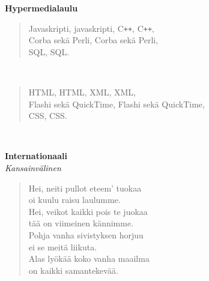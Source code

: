 %
%
\noindent\begin{minipage}{\linewidth}
\vspace{5pt}
\parbox[t]{0.85\linewidth}{\raggedright {\large\bf Hypermedialaulu}\\[6pt]}
\begin{verse}
	Javaskripti, javaskripti, C\texttt{+}\texttt{+}, C\texttt{+}\texttt{+},\\
	Corba sekä Perli, Corba sekä Perli,\\
	SQL, SQL.\\
\end{verse}
\end{minipage}\\[10pt]
\noindent\begin{minipage}{\linewidth}
\begin{verse}
	HTML, HTML, XML, XML,\\
	Flashi sekä QuickTime, Flashi sekä QuickTime,\\
	CSS, CSS.\\
\end{verse}
\end{minipage}\\[10pt]
%
%
\noindent\begin{minipage}{\linewidth}
\vspace{5pt}
\parbox[t]{0.85\linewidth}{\raggedright {\large\bf Internationaali}\\[2pt]\small\emph{Kansainvälinen}\\[6pt]}
\begin{verse}
	
	Hei, neiti pullot eteem' tuokaa\\
	oi kuulu raisu laulumme.\\
	Hei, veikot kaikki pois te juokaa\\
	tää on viimeinen kännimme.\\
	Pohja vanha sivistyksen horjuu\\
	ei se meitä liikuta.\\
	Alas lyökää koko vanha maailma\\
	on kaikki samantekevää.\\
\end{verse}
\end{minipage}\\[10pt]

